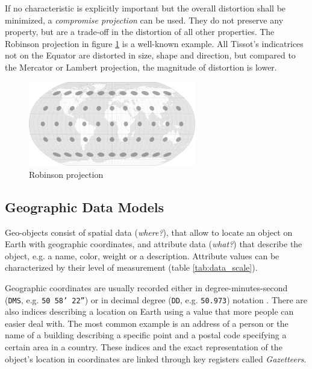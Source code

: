 If no characteristic is explicitly important but the overall distortion shall be minimized, a \emph{compromise projection} can be used. They do not preserve any property, but are a trade-off in the distortion of all other properties. The Robinson projection in figure \ref{fig:robinson_projection} is a well-known example. All Tissot's indicatrices not on the Equator are distorted in size, shape and direction, but compared to the Mercator or Lambert projection, the magnitude of distortion is lower.

\begin{figure}[ht]
  \centering
  \includegraphics[width=0.65\textwidth]{graphics/basics/projection_distortion_robinson.png}
  \caption{Robinson projection \protect\footnotemark}
  \label{fig:robinson_projection}
\end{figure}




\subsection{Geographic Data Models} %
\label{ssub:data_models}

Geo-objects consist of spatial data (\emph{where?}), that allow to locate an object on Earth with geographic coordinates, and attribute data (\emph{what?}) that describe the object, e.g. a name, color, weight or a description. Attribute values can be characterized by their level of measurement (table \ref{tab:data_scale}).

Geographic coordinates are usually recorded either in degree-minutes-second (\texttt{DMS}, e.g. \texttt{50\degree~58' 22''}) or in decimal degree (\texttt{DD}, e.g. \texttt{50.973}) notation
\cite[pp. 30, 79]{bolstad2008gis}.
There are also indices describing a location on Earth using a value that more people can easier deal with. The most common example is an address of a person or the name of a building describing a specific point and a postal code specifying a certain area in a country. These indices and the exact representation of the object's location in coordinates are linked through key registers called \emph{Gazetteers}.



